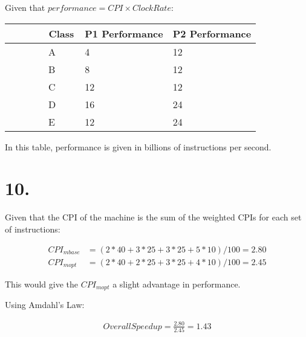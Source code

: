 \documentclass[12pt]{article}
\begin{document}
Given that $performance = CPI \times Clock Rate$:
\begin{center}
\begin{tabular}{|l|l|l|}
	\hline
        Class & P1 Performance &  P2 Performance \\ \hline
        A     & 4              & 12              \\ \hline
        B     & 8              & 12              \\ \hline
        C     & 12             & 12              \\ \hline
        D     & 16             & 24              \\ \hline
        E     & 12             & 24              \\
	\hline
\end{tabular}

In this table, performance is given in billions of instructions per second.
\end{center}

\section*{10.}

Given that the CPI of the machine is the sum of the weighted CPIs for each set of instructions:

\begin{align*}
	CPI_{mbase} &= (2 * 40 + 3 * 25 + 3 * 25 + 5 * 10) / 100 = 2.80 \\
	CPI_{mopt} &= (2 * 40 + 2 * 25 + 3 * 25 + 4 * 10) / 100 = 2.45
\end{align*}

This would give the $CPI_{mopt}$ a slight advantage in performance.

Using Amdahl's Law:

\begin{align*}
Overall Speedup = \frac{2.80}{2.45} = 1.43 
\end{align*}
\end{document}
